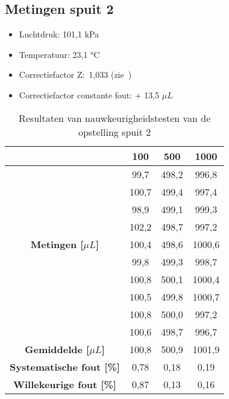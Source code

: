 \pagebreak

\subsection*{Metingen spuit 2}
\begin{itemize}
    \item Luchtdruk: 101,1 kPa
    \item Temperatuur: 23,1 °C
    \item Correctiefactor Z:\ 1,033 (zie\ \cite{RN50})
    \item Correctiefactor constante fout: + 13,5 $\mu L$
\end{itemize}
\begin{table}[H] 
    \centering 
    \caption{Resultaten van nauwkeurigheidstesten van de opstelling spuit 2}
    \begin{tabular}{|c|c|c|c|}
        \hline
        \textbf{\rule{0pt}{3ex} Gewenste Volume [$\mu L$]} & 100 & 500 & 1000 \\
        \hline 
        &99,7  & 498,2 & 996,8 \\
        &100,7 & 499,4 & 997,4 \\
        &98,9  & 499,1 & 999,3 \\
        &102,2 & 498,7 & 997,2 \\
        \textbf{Metingen [$\mu L$]}&100,4 & 498,6 & 1000,6 \\
        &99,8  & 499,3 & 998,7 \\
        &100,8 & 500,1 & 1000,4 \\
        &100,5 & 499,8 & 1000,7 \\
        &100,8 & 500,0 & 997,2 \\
        &100,6 & 498,7 & 996,7 \\
        \hline
        \textbf{Gemiddelde [$\mu L$]} &100,8 & 500,9 & 1001,9\\
        \textbf{Systematische fout [\%]} &0,78 & 0,18 & 0,19\\
        \textbf{Willekeurige fout [\%]} &0,87 & 0,13 & 0,16\\
        \hline
    \end{tabular}\label{tab:resultaten_spuit_2}
\end{table}